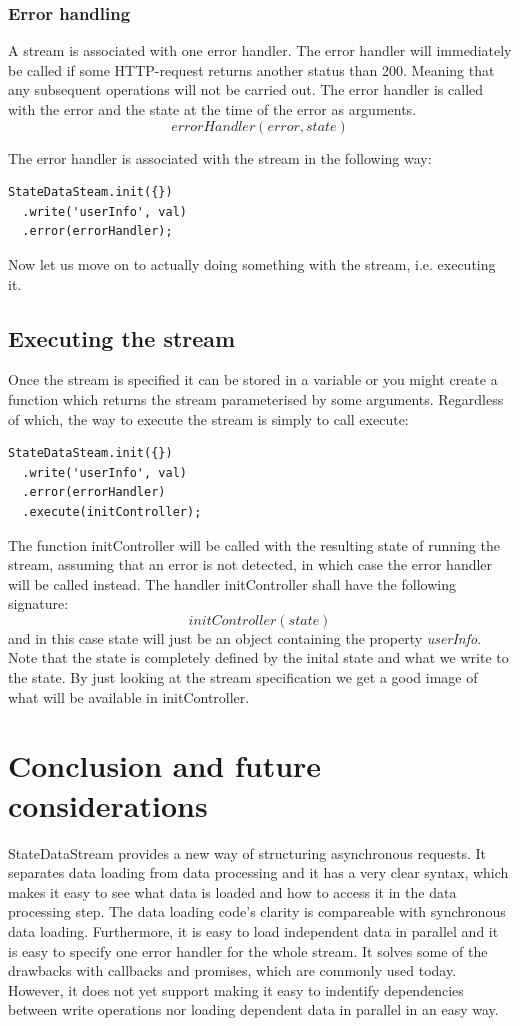 \documentclass[a4paper,12pt]{article}
\begin{document}
\subsubsection{Error handling}
A stream is associated with one error handler. The error handler will immediately be called if some HTTP-request returns another status than 200. Meaning that any subsequent
operations will not be carried out. The error handler is called with the error and the state at the time of the error as arguments.
\[ errorHandler(error, state) \]

The error handler is associated with the stream in the following way:
\begin{lstlisting}[caption=Attaching an error handler to the stream, frame=single]
StateDataSteam.init({})
  .write('userInfo', val)
  .error(errorHandler);
\end{lstlisting}
Now let us move on to actually doing something with the stream, i.e. executing it.

\subsection{Executing the stream}
Once the stream is specified it can be stored in a variable or you might create a function which returns the stream parameterised by some arguments.
Regardless of which, the way to execute the stream is simply to call execute:

\begin{lstlisting}[caption=Executing the stream, frame=single]
StateDataSteam.init({})
  .write('userInfo', val)
  .error(errorHandler)
  .execute(initController);
\end{lstlisting}
The function initController will be called with the resulting state of running the stream, assuming that an error is not detected, in which case the error handler will be called instead. 
The handler initController shall have the following signature:
\[ initController(state) \]
and in this case state will just be an object containing the property \emph{userInfo}. Note that the state is completely defined by the inital state and what we write to the state.
By just looking at the stream specification we get a good image of what will be available in initController.

\section{Conclusion and future considerations}
\label{sec:future}
StateDataStream provides a new way of structuring asynchronous requests. It separates data loading from data processing and it has a very clear syntax, which makes it easy to see 
what data is loaded and how to access it in the data processing step. The data loading code's clarity is compareable with synchronous data loading.
Furthermore, it is easy to load independent data in parallel and it is easy to specify one 
error handler for the whole stream. It solves some of the drawbacks with callbacks and promises, which are commonly used today. However, it does not yet support making it easy to indentify dependencies between write operations nor loading dependent data in parallel
in an easy way.
\end{document}
